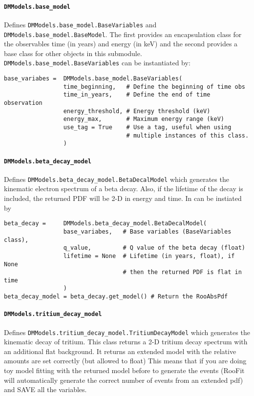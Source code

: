 			\paragraph{\lstinline!DMModels.base_model!}
Defines \lstinline!DMModels.base_model.BaseVariables! and
\lstinline!DMModels.base_model.BaseModel!.  The first provides an encapsulation
class for the observables time (in years) and energy (in keV) and the second
provides a base class for other objects in this submodule.
\lstinline!DMModels.base_model.BaseVariables! can be instantiated by:
				\begin{lstlisting}			
base_variabes =  DMModels.base_model.BaseVariables( 
                 time_beginning,   # Define the beginning of time obs
                 time_in_years,    # Define the end of time observation
                 energy_threshold, # Energy threshold (keV)
                 energy_max,       # Maximum energy range (keV)
                 use_tag = True    # Use a tag, useful when using 
                                   # multiple instances of this class.
                 ) 
				\end{lstlisting}				

			\paragraph{\lstinline!DMModels.beta_decay_model!}
Defines \lstinline!DMModels.beta_decay_model.BetaDecalModel! which generates the kinematic
electron spectrum of a beta decay.  Also, if the lifetime of the decay is included, the returned PDF will
be 2-D in energy and time.  In can be instiated by 
				\begin{lstlisting}			
beta_decay =     DMModels.beta_decay_model.BetaDecalModel(
                 base_variabes,   # Base variables (BaseVariables class), 
                 q_value,         # Q value of the beta decay (float)
                 lifetime = None  # Lifetime (in years, float), if None 
                                  # then the returned PDF is flat in time
                 )
beta_decay_model = beta_decay.get_model() # Return the RooAbsPdf
				\end{lstlisting}				

			\paragraph{\lstinline!DMModels.tritium_decay_model!}			
Defines \lstinline!DMModels.tritium_decay_model.TritiumDecayModel! which generates the kinematic decay of
tritium.  This class returns a 2-D tritium decay spectrum with an additional flat background.  
It returns an extended model with the relative amounts are set correctly (but allowed to float)
This means that if you are doing toy model fitting with the returned model before to generate
the events (RooFit will automatically generate the correct number of events from an extended pdf)
and SAVE all the variables. 

